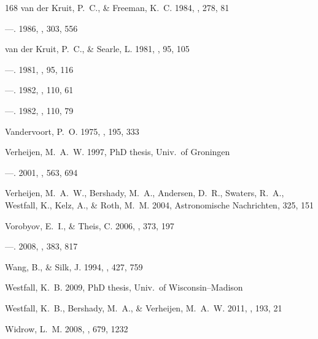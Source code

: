 \documentclass[apj,iop,numberedappendix]{emulateapj}
\begin{document}
\begin{thebibliography}{168}
{van der Kruit}, P.~C., \& {Freeman}, K.~C. 1984, \apj, 278, 81

---. 1986, \apj, 303, 556

{van der Kruit}, P.~C., \& {Searle}, L. 1981{}, \aap, 95, 105

---. 1981{}, \aap, 95, 116

---. 1982{}, \aap, 110, 61

---. 1982{}, \aap, 110, 79

{Vandervoort}, P.~O. 1975, \apj, 195, 333

{Verheijen}, M.~A.~W. 1997, PhD thesis, Univ.~of Groningen

---. 2001, \apj, 563, 694

{Verheijen}, M.~A.~W., {Bershady}, M.~A., {Andersen}, D.~R., {Swaters}, R.~A.,
  {Westfall}, K., {Kelz}, A., \& {Roth}, M.~M. 2004, Astronomische Nachrichten,
  325, 151

{Vorobyov}, E.~I., \& {Theis}, C. 2006, \mnras, 373, 197

---. 2008, \mnras, 383, 817

{Wang}, B., \& {Silk}, J. 1994, \apj, 427, 759

{Westfall}, K.~B. 2009, PhD thesis, Univ.~of Wisconsin--Madison

{Westfall}, K.~B., {Bershady}, M.~A., \& {Verheijen}, M.~A.~W. 2011, \apjs,
  193, 21

{Widrow}, L.~M. 2008, \apj, 679, 1232


\end{thebibliography}
\end{document}
